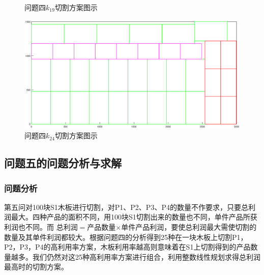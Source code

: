 \documentclass[hyperref,UTF8]{article}
\begin{document}
{\begin{figure}[htbp]
  \caption{问题四$k_{19}$切割方案图示 }\label{qiegexx3}
\end{figure}
\begin{figure}[htbp]
  \centering
  \includegraphics[width=\textwidth]{picture/P3_4}
  \caption{问题四$k_{24}$切割方案图示 }\label{qiegexx4}
\end{figure}
\subsection{问题五的问题分析与求解}
\subsubsection{问题分析}
第五问对100块S1木板进行切割，对P1、P2、P3、P4的数量不作要求，只要总利润最大。四种产品的面积不同，用100块S1切割出来的数量也不同，单件产品所获利润也不同。而 总利润$=$产品数量$\times$单件产品利润，要使总利润最大需使切割的数量及其单件利润都较大。根据问题四的分析得到25种在一块木板上切割P1，P2，P3，P4的高利用率方案，木板利用率越高则意味着在S1上切割得到的产品数量越多。我们仍然对这25种高利用率方案进行组合，利用整数线性规划求得总利润最高时的切割方案。
}
\end{document}
